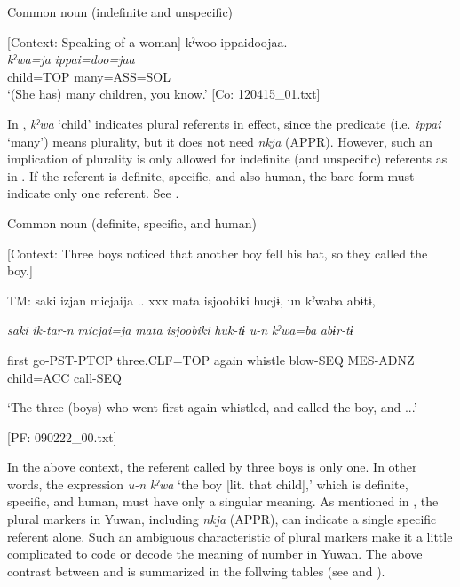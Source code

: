 \ea \label{ex:7:4}  Common noun (indefinite and unspecific)

  [Context: Speaking of a woman]
\glll  kˀwoo  ippaidoojaa.\\
\textit{kˀwa=ja}  \textit{ippai=doo=jaa}\\
child=TOP  many=ASS=SOL\\
\glt ‘(She has) many children, you know.’ [Co: 120415\_01.txt]
\z

In , \textit{kˀwa} ‘child’ indicates plural referents in effect, since the predicate (i.e. \textit{ippai} ‘many’) means plurality, but it does not need \textit{nkja} (APPR). However, such an implication of plurality is only allowed for indefinite (and unspecific) referents as in . If the referent is definite, specific, and also human, the bare form must indicate only one referent. See .

\ea \label{ex:7:5}  Common noun (definite, specific, and human)

  [Context: Three boys noticed that another boy fell his hat, so they called the boy.]

  TM:  saki  izjan  micjaija ..  xxx  mata  isjoobiki  hucjɨ,  un  kˀwaba  abɨtɨ,

    \textit{saki}  \textit{ik-tar-n}  \textit{micjai=ja}    \textit{mata}  \textit{isjoobiki}  \textit{huk-tɨ}  \textit{u-n}  \textit{kˀwa=ba}  \textit{abɨr-tɨ}
                                                                                                                
    first  go-PST-PTCP  three.CLF=TOP    again  whistle  blow-SEQ  MES-ADNZ  child=ACC  call-SEQ

    ‘The three (boys) who went first again whistled, and called the boy, and ...’

    [PF: 090222\_00.txt]
\z

In the above context, the referent called by three boys is only one. In other words, the expression \textit{u-n} \textit{kˀwa} ‘the boy [lit. that child],’ which is definite, specific, and human, must have only a singular meaning. As mentioned in , the plural markers in Yuwan, including \textit{nkja} (APPR), can indicate a single specific referent alone. Such an ambiguous characteristic of plural markers make it a little complicated to code or decode the meaning of number in Yuwan. The above contrast between  and  is summarized in the follwing tables (see  and ).

